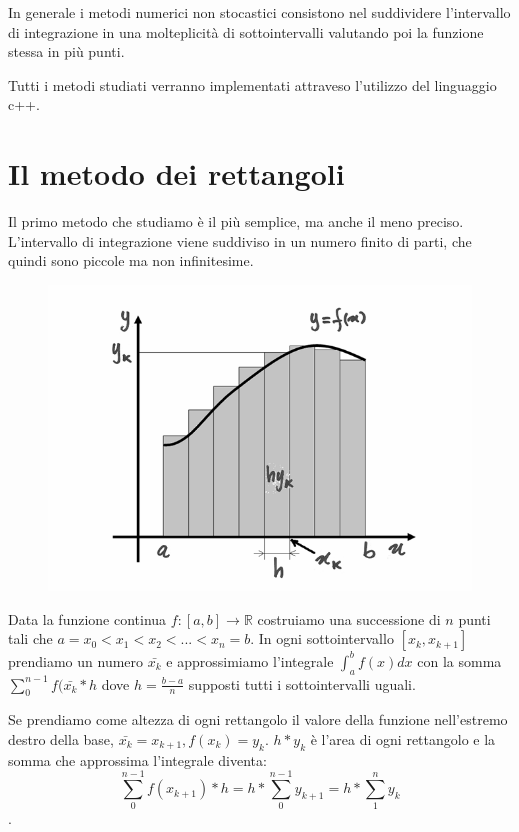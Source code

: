 \documentclass{article}
\begin{document}
In generale i metodi numerici non stocastici consistono nel suddividere l'intervallo di integrazione in una molteplicità di sottointervalli valutando poi la funzione stessa in più punti.

Tutti i metodi studiati verranno implementati attraveso l'utilizzo del linguaggio c++.

\newpage
\section{Il metodo dei rettangoli}
Il primo metodo che studiamo è il più semplice, ma anche il meno preciso. L’intervallo di integrazione viene suddiviso in un numero finito di parti, che quindi sono piccole ma non infinitesime.
\begin{figure}[ht]
\centering
\includegraphics[scale=0.25]{img/09_01_int_rettangoli.png} 
\label{fig:rect}
\end{figure}

Data la funzione continua $f:[a,b]\rightarrow \mathbb{R}$ costruiamo una successione di $n$ punti tali che $a=x_0<x_1<x_2<...<x_n=b$.
In ogni sottointervallo $[x_k,x_{k+1}]$ prendiamo un numero $\bar{x_k}$ e approssimiamo l'integrale $\int_{a}^{b}f(x)dx$ con la somma $\sum_{0}^{n-1}f(\bar{x_k}*h$ dove $h = \frac{b-a}{n}$ supposti tutti i sottointervalli uguali.

Se prendiamo come altezza di ogni rettangolo il valore della funzione nell'estremo destro della base, $\bar{x_k} = x_{k+1} , f(x_k)=y_k$. $h*y_k$ è l’area di ogni rettangolo e la somma che approssima l’integrale diventa: \[\sum_{0}^{n-1}f(x_{k+1})*h = h*\sum_{0}^{n-1}y_{k+1}=h*\sum_{1}^{n}y_k\].
\end{document}
